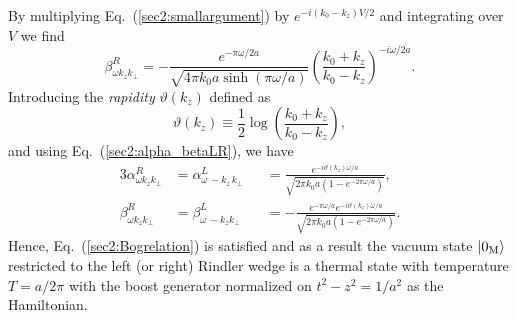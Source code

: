 \documentclass[12pt,nofootinbib,floatfix,aps,prd,showpacs,amsmath,amssymb,eqsecnum]{revtex4-2}
\begin{document}
By multiplying Eq.~(\ref{sec2:smallargument}) by $e^{-i(k_0-k_z)V/2}$
and integrating over $V$ we find
\begin{equation}
\beta_{\omega k_z k_\perp}^R =  - \frac{e^{-\pi\omega/2a}}
{\sqrt{4\pi k_0 a \sinh(\pi\omega/a)}}
\left(\frac{k_0+k_z}{k_0-k_z}\right)^{-i\omega/2a}.
\end{equation}
Introducing the {\em rapidity} $\vartheta(k_z)$ defined as
\begin{equation}
\vartheta(k_z) \equiv  \frac{1}{2}\log \left(
\frac{k_0+k_z}{k_0-k_z}\right), \label{sec2:rapidity}
\end{equation}
and using Eq.~(\ref{sec2:alpha_betaLR}), we
have
\begin{alignat}{3}
\alpha^R_{\omega k_z k_\perp} & =
\alpha^L_{\omega\, -k_z\, k_\perp} 
&& =  \frac{e^{-i\vartheta(k_z)\omega/a}}{\sqrt{2\pi k_0 a
(1-e^{-2\pi\omega/a})}},\\
\beta^R_{\omega k_z k_\perp} & =
\beta^L_{\omega\,-k_z k_\perp}
&& =
- \frac{e^{-\pi\omega/a}e^{-i\vartheta(k_z)\omega/a}}{\sqrt{2\pi k_0 a
(1-e^{-2\pi\omega/a})}}.
\end{alignat}
Hence, Eq.~(\ref{sec2:Bogrelation}) is
satisfied and as a result the vacuum state $|0_{\rm M}\rangle$
restricted to the left (or right) Rindler wedge is a thermal state with
temperature $T= a/2\pi$ with the boost generator normalized on
$t^2-z^2=1/a^2$ as the Hamiltonian.
\end{document}
